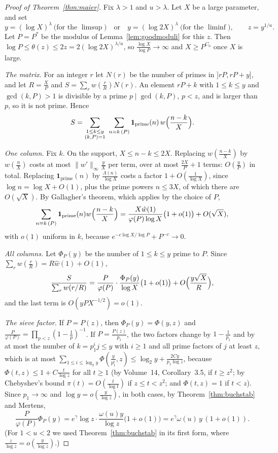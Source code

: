 \begin{proof}[Proof of Theorem~\ref{thm:maier}]
Fix $\lambda>1$ and $u>\lambda$. Let $X$ be a large parameter, and set
\[
y=(\log X)^\lambda\ \text{(for the }\limsup\text{)}\quad\text{or}\quad y=(\log2X)^\lambda\ \text{(for the }\liminf\text{)},\qquad z=y^{1/u}.
\]
Let $P=P^*$ be the modulus of Lemma~\ref{lem:goodmoduli} for this $z$. Then $\log P\le\theta(z)\le2z=2(\log2X)^{\lambda/u}$, so $\frac{\log X}{\log P}\to\infty$ and $X\ge P^{C_0}$ once $X$ is large.

\emph{The matrix.} For an integer $r$ let $N(r)$ be the number of primes in $]rP,rP+y]$, and let $R=\frac XP$ and $S=\sum_rw(\frac rR)N(r)$. An element $rP+k$ with $1\le k\le y$ and $\gcd(k,P)>1$ is divisible by a prime $p\mid\gcd(k,P)$, $p<z$, and is larger than $p$, so it is not prime. Hence
\[
S=\sum_{\substack{1\le k\le y\\(k,P)=1}}\ \sum_{n\equiv k\,(P)}\mathbf 1_{\text{prime}}(n)\,w\Bigl(\frac{n-k}{X}\Bigr).
\]

\emph{One column.} Fix $k$. On the support, $X\le n-k\le2X$. Replacing $w(\frac{n-k}X)$ by $w(\frac nX)$ costs at most $\|w'\|_\infty\frac yX$ per term, over at most $\frac{2X}P+1$ terms: $O(\frac yP)$ in total. Replacing $\mathbf 1_{\text{prime}}(n)$ by $\frac{\Lambda(n)}{\log X}$ costs a factor $1+O(\frac1{\log X})$, since $\log n=\log X+O(1)$, plus the prime powers $n\le3X$, of which there are $O(\sqrt X)$. By Gallagher's theorem, which applies by the choice of $P$,
\[
\sum_{n\equiv k\,(P)}\mathbf 1_{\text{prime}}(n)w\Bigl(\frac{n-k}X\Bigr)=\frac{X\hat w(1)}{\varphi(P)\log X}\bigl(1+o(1)\bigr)+O(\sqrt X),
\]
with $o(1)$ uniform in $k$, because $e^{-c\log X/\log P}+P^{-c}\to0$.

\emph{All columns.} Let $\Phi_P(y)$ be the number of $1\le k\le y$ prime to $P$. Since $\sum_rw(\frac rR)=R\hat w(1)+O(1)$,
\[
\frac{S}{\sum_rw(r/R)}=\frac{P}{\varphi(P)}\cdot\frac{\Phi_P(y)}{\log X}\bigl(1+o(1)\bigr)+O\Bigl(\frac{y\sqrt X}{R}\Bigr),
\]
and the last term is $O(yP X^{-1/2})=o(1)$.

\emph{The sieve factor.} If $P=P(z)$, then $\Phi_P(y)=\Phi(y,z)$ and $\frac P{\varphi(P)}=\prod_{p<z}(1-\frac1p)^{-1}$. If $P=\frac{P(z)}{p_1}$, the two factors change by $1-\frac1{p_1}$ and by at most the number of $k=p_1^ij\le y$ with $i\ge1$ and all prime factors of $j$ at least $z$, which is at most $\sum_{1\le i\le\log_2y}\Phi(\frac y{p_1^i},z)\le\log_2y+\frac{2Cy}{p_1\log z}$, because $\Phi(t,z)\le1+C\frac t{\log z}$ for all $t\ge1$ (by Volume~14, Corollary~3.5, if $t\ge z^2$; by Chebyshev's bound $\pi(t)=O(\frac t{\log t})$ if $z\le t<z^2$; and $\Phi(t,z)=1$ if $t<z$). Since $p_1\to\infty$ and $\log y=o(\frac y{\log z})$, in both cases, by Theorem~\ref{thm:buchstab} and Mertens,
\[
\frac P{\varphi(P)}\Phi_P(y)=e^\gamma\log z\cdot\frac{\omega(u)y}{\log z}\bigl(1+o(1)\bigr)=e^\gamma\omega(u)\,y\,(1+o(1)).
\]
(For $1<u<2$ we used Theorem~\ref{thm:buchstab} in its first form, where $\frac z{\log z}=o(\frac y{\log z})$.)


\end{proof}
